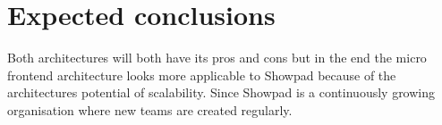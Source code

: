 \section{Expected conclusions}
\label{sec:verwachte_conclusies}

Both architectures will both have its pros and cons but in the end the micro frontend architecture looks more applicable to Showpad because of the architectures potential of scalability. Since Showpad is a continuously growing organisation where new teams are created regularly.
